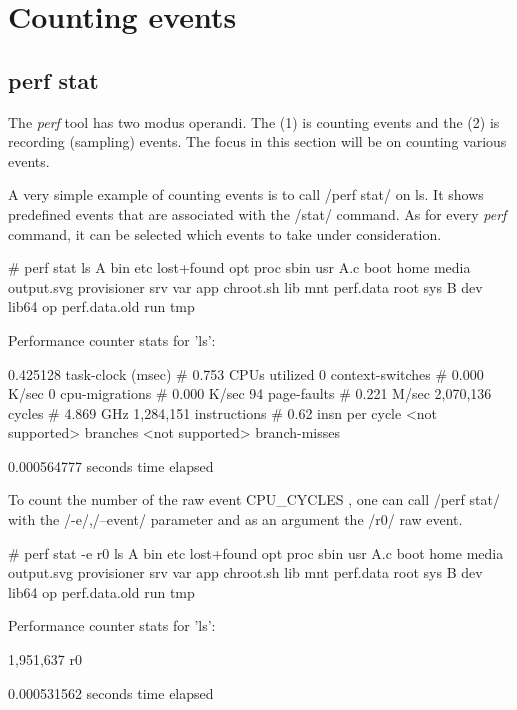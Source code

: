 \chapter{Counting events}
\section{perf stat}
The {\em perf} tool has two modus operandi. The (1) is counting events
and the (2) is recording (sampling) events. The focus in this section
will be on counting various events.

A very simple example of counting events is to call /perf stat/ on ls.
It shows predefined events that are associated with the /stat/ command.
As for every {\em perf} command, it can be selected which events to take
under consideration.

\starttyping
# perf stat ls
A    bin	etc    lost+found  opt		  proc	       sbin  usr
A.c  boot	home   media	   output.svg	  provisioner  srv   var
app  chroot.sh	lib    mnt	   perf.data	  root	       sys
B    dev	lib64  op	   perf.data.old  run	       tmp

 Performance counter stats for 'ls':

          0.425128      task-clock (msec)         #    0.753 CPUs utilized
                 0      context-switches          #    0.000 K/sec
                 0      cpu-migrations            #    0.000 K/sec
                94      page-faults               #    0.221 M/sec
         2,070,136      cycles                    #    4.869 GHz
         1,284,151      instructions              #    0.62  insn per cycle
   <not supported>      branches
   <not supported>      branch-misses

       0.000564777 seconds time elapsed

\stoptyping

To count the number of the raw event CPU_CYCLES , one can call /perf
stat/ with the /-e/,/--event/ parameter and as an argument the /r0/
raw event.

\starttyping
# perf stat -e r0 ls
A    bin	etc    lost+found  opt		  proc	       sbin  usr
A.c  boot	home   media	   output.svg	  provisioner  srv   var
app  chroot.sh	lib    mnt	   perf.data	  root	       sys
B    dev	lib64  op	   perf.data.old  run	       tmp

 Performance counter stats for 'ls':

         1,951,637      r0

       0.000531562 seconds time elapsed

